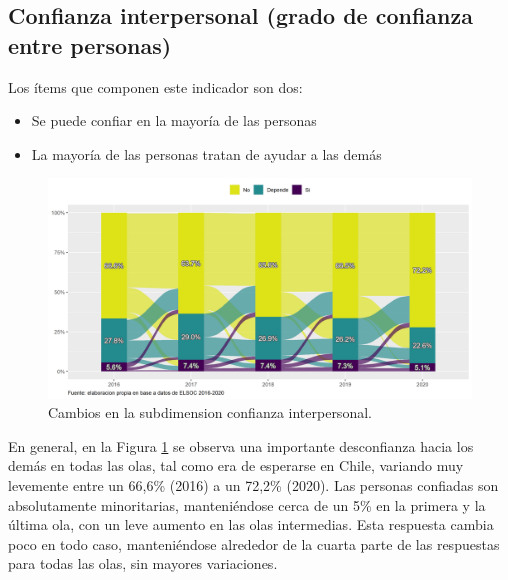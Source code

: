 \documentclass[
  12pt,
]{book}
\begin{document}
\hypertarget{confianza-interpersonal-grado-de-confianza-entre-personas}{%
\subsection{Confianza interpersonal (grado de confianza entre personas)}\label{confianza-interpersonal-grado-de-confianza-entre-personas}}

Los ítems que componen este indicador son dos:

\begin{itemize}
\item
  Se puede confiar en la mayoría de las personas
\item
  La mayoría de las personas tratan de ayudar a las demás
\end{itemize}

\begin{figure}[H]

{\centering \includegraphics[width=1\linewidth,height=1\textheight]{output/graphs/alluvial_conf_interpersonal} 

}

\caption{Cambios en la subdimension confianza interpersonal.}\label{fig:alluvial-conf-interpersonal}
\end{figure}

En general, en la Figura \ref{fig:alluvial-conf-interpersonal} se observa una importante desconfianza hacia los demás en todas las olas, tal como era de esperarse en Chile, variando muy levemente entre un 66,6\% (2016) a un 72,2\% (2020). Las personas confiadas son absolutamente minoritarias, manteniéndose cerca de un 5\% en la primera y la última ola, con un leve aumento en las olas intermedias. Esta respuesta cambia poco en todo caso, manteniéndose alrededor de la cuarta parte de las respuestas para todas las olas, sin mayores variaciones.
\end{document}
